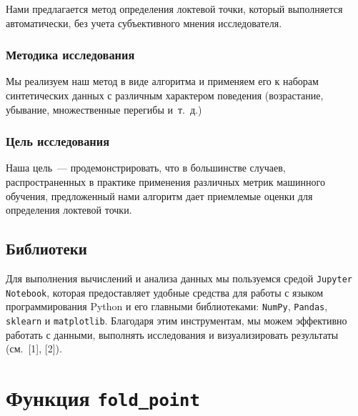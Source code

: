 \documentclass[a4paper,12pt]{article}
\begin{document}
Нами предлагается метод определения локтевой точки, который выполняется автоматически, без учета субъективного мнения исследователя.

\subsubsection{Методика исследования} 

Мы реализуем наш метод в виде алгоритма и применяем его к наборам синтетических данных с различным характером поведения (возрастание, убывание, множественные перегибы и т. д.)

\subsubsection{Цель исследования} 

Наша цель — продемонстрировать, что в большинстве случаев, распространенных в практике применения различных метрик машинного обучения, предложенный нами алгоритм дает приемлемые оценки для определения локтевой точки.

\subsection{Библиотеки}
Для выполнения вычислений и анализа данных мы пользуемся средой \texttt{Jupyter Notebook}, которая предоставляет удобные средства для работы с языком программирования Python и его главными библиотеками: \texttt{NumPy}, \texttt{Pandas}, \texttt{sklearn} и \texttt{matplotlib}. Благодаря этим инструментам, мы можем эффективно работать с данными, выполнять исследования и визуализировать результаты (см. [1], [2]). 

%


\section{Функция \textbf{\texttt{fold\_point}}}
\end{document}
